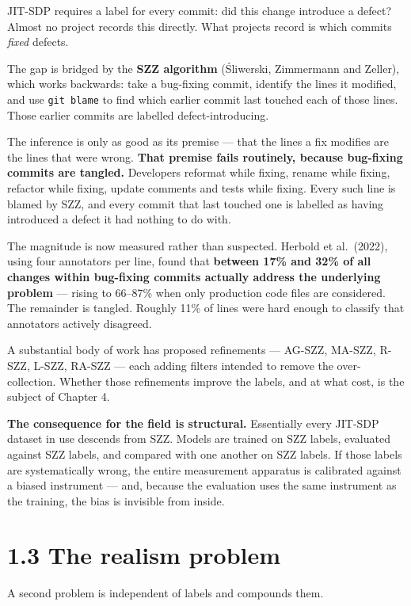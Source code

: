 JIT-SDP requires a label for every commit: did this change introduce a
defect? Almost no project records this directly. What projects record is
which commits \emph{fixed} defects.

The gap is bridged by the \textbf{SZZ algorithm} (\'{S}liwerski, Zimmermann
and Zeller), which works backwards: take a bug-fixing commit, identify
the lines it modified, and use \texttt{git\ blame} to find which earlier
commit last touched each of those lines. Those earlier commits are
labelled defect-introducing.

The inference is only as good as its premise --- that the lines a fix
modifies are the lines that were wrong. \textbf{That premise fails
routinely, because bug-fixing commits are tangled.} Developers reformat
while fixing, rename while fixing, refactor while fixing, update
comments and tests while fixing. Every such line is blamed by SZZ, and
every commit that last touched one is labelled as having introduced a
defect it had nothing to do with.

The magnitude is now measured rather than suspected. Herbold et
al.~(2022), using four annotators per line, found that \textbf{between
17\% and 32\% of all changes within bug-fixing commits actually address
the underlying problem} --- rising to 66--87\% when only production code
files are considered. The remainder is tangled. Roughly 11\% of lines
were hard enough to classify that annotators actively disagreed.

A substantial body of work has proposed refinements --- AG-SZZ, MA-SZZ,
R-SZZ, L-SZZ, RA-SZZ --- each adding filters intended to remove the
over-collection. Whether those refinements improve the labels, and at
what cost, is the subject of Chapter 4.

\textbf{The consequence for the field is structural.} Essentially every
JIT-SDP dataset in use descends from SZZ. Models are trained on SZZ
labels, evaluated against SZZ labels, and compared with one another on
SZZ labels. If those labels are systematically wrong, the entire
measurement apparatus is calibrated against a biased instrument --- and,
because the evaluation uses the same instrument as the training, the
bias is invisible from inside.

\section{1.3 The realism problem}\label{the-realism-problem}

A second problem is independent of labels and compounds them.

